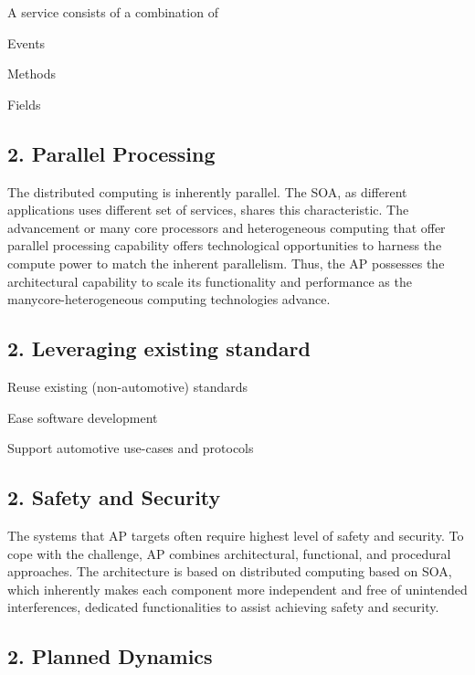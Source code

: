 A service consists of a combination of
\begin{DoxyItemize}
\item Events
\item Methods
\item Fields
\end{DoxyItemize}

\subsection*{2. Parallel Processing}

The distributed computing is inherently parallel. The S\+OA, as different applications uses different set of services, shares this characteristic. The advancement or many core processors and heterogeneous computing that offer parallel processing capability offers technological opportunities to harness the compute power to match the inherent parallelism. Thus, the AP possesses the architectural capability to scale its functionality and performance as the manycore-\/heterogeneous computing technologies advance.

\subsection*{2. Leveraging existing standard}


\begin{DoxyItemize}
\item Reuse existing (non-\/automotive) standards
\item Ease software development
\item Support automotive use-\/cases and protocols 
\end{DoxyItemize}

\subsection*{2. Safety and Security}

The systems that AP targets often require highest level of safety and security. To cope with the challenge, AP combines architectural, functional, and procedural approaches. The architecture is based on distributed computing based on S\+OA, which inherently makes each component more independent and free of unintended interferences, dedicated functionalities to assist achieving safety and security.

\subsection*{2. Planned Dynamics}

